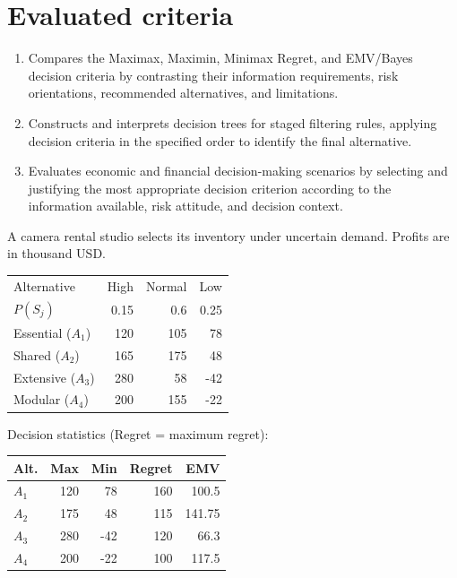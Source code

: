 \section*{Evaluated criteria}
\begin{enumerate}[label=\textbf{C\arabic*},start=8]
\item Compares the Maximax, Maximin, Minimax Regret, and EMV/Bayes decision criteria by contrasting their information requirements, risk orientations, recommended alternatives, and limitations.
\item Constructs and interprets decision trees for staged filtering rules, applying decision criteria in the specified order to identify the final alternative.
\item Evaluates economic and financial decision-making scenarios by selecting and justifying the most appropriate decision criterion according to the information available, risk attitude, and decision context.
\end{enumerate}



A camera rental studio selects its inventory under uncertain demand. Profits are in thousand USD.

\vspace{-3mm}
\begin{center}\small\setlength{\tabcolsep}{4pt}
	\begin{tabular}{lrrr}\toprule
		Alternative & High & Normal & Low\\
		$P(S_j)$ & 0.15 & 0.6 & 0.25\\ \midrule
				Essential ($A_1$) & 120 & 105 & 78\\
		Shared ($A_2$) & 165 & 175 & 48\\
		Extensive ($A_3$) & 280 & 58 & -42\\
		Modular ($A_4$) & 200 & 155 & -22\\
		\bottomrule
	\end{tabular}
\end{center} \vspace*{-3mm}

Decision statistics (Regret = maximum regret):

\vspace{-3mm}
\begin{center}\small\setlength{\tabcolsep}{4pt}
	\begin{tabular}{lrrrr}\toprule
		Alt. & Max & Min & Regret & EMV\\ \midrule
				$A_1$ & 120 & 78 & 160 & 100.5\\
		$A_2$ & 175 & 48 & 115 & 141.75\\
		$A_3$ & 280 & -42 & 120 & 66.3\\
		$A_4$ & 200 & -22 & 100 & 117.5\\
		\bottomrule
	\end{tabular}
\end{center}
\vspace{-3mm}

